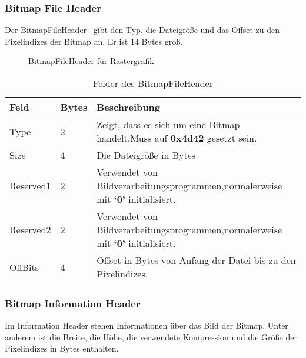\documentclass[course=erap]{aspdoc}
\newcommand{\hexdump}[2]{
 \begin{figure}[H]
   \small
   
   \vspace*{-5mm}
   \caption{#2}
 \end{figure}
}
\begin{document}
\subsubsection{Bitmap File Header}
Der BitmapFileHeader~\cite{bitmapFileHeader} gibt den Typ, die Dateigröße und das Offset zu den Pixelindizes der Bitmap an. Er ist 14 Bytes groß.

\hexdump{res/example_28_5x5_fileheader.txt}{BitmapFileHeader für Rastergrafik}
\begin{table}[h!]
\begin{tabular}{ |p{6em}|p{3em}|p{25.75em}| }
    \hline
    \textbf{Feld} & \textbf{Bytes} & \textbf{Beschreibung} \\
    \hline
    Type & 2 & Zeigt, dass es sich um eine Bitmap handelt.\newline Muss auf \textbf{0x4d42} gesetzt sein. \\ \hline
    Size & 4 & Die Dateigröße in Bytes \\
    \hline
    Reserved1 & 2 & Verwendet von Bildverarbeitungsprogrammen,\newline normalerweise mit \textbf{`0'} initialisiert. \\
    \hline
    Reserved2 & 2 & Verwendet von Bildverarbeitungsprogrammen,\newline normalerweise mit \textbf{`0'} initialisiert. \\
    \hline
    OffBits & 4 & Offset in Bytes von Anfang der Datei bis zu den Pixelindizes. \\
    \hline
\end{tabular}
\caption{Felder des BitmapFileHeader}
\end{table}



\subsubsection{Bitmap Information Header}
Im Information Header stehen Informationen über das Bild der Bitmap. \newline Unter anderem ist die Breite, die Höhe, die verwendete Kompression und die Größe der Pixelindizes in Bytes enthalten.\newline

\end{document}
